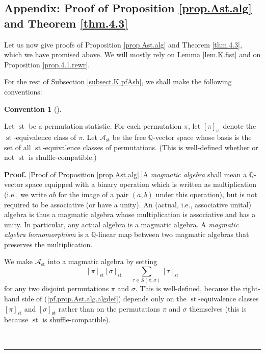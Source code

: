 \documentclass[numbers=enddot,12pt,final,onecolumn,notitlepage]{scrartcl}%
\theoremstyle{definition}
\newtheorem{conv}[theo]{Convention}
\newenvironment{convention}[1][]
{\begin{conv}[#1]\begin{leftbar}}
{\end{leftbar}\end{conv}}
\newenvironment{proof}[1][Proof]{\noindent\textbf{#1.} }{\ \rule{0.5em}{0.5em}}
\newenvironment{convention}[1][Convention]{\noindent\textbf{#1.} }{\ \rule{0.5em}{0.5em}}
\newenvironment{verlong}{}{}
\let\sumnonlimits\sum
\renewcommand{\sum}{\sumnonlimits\limits}
\begin{document}
\begin{verlong}
\subsection{\label{subsect.K.pfAsh}Appendix: Proof of Proposition
\ref{prop.Ast.alg} and Theorem \ref{thm.4.3}}

Let us now give proofs of Proposition \ref{prop.Ast.alg} and Theorem
\ref{thm.4.3}, which we have promised above. We will mostly rely on Lemma
\ref{lem.K.fist} and on Proposition \ref{prop.4.1.rewr}.

For the rest of Subsection \ref{subsect.K.pfAsh}, we shall make the following conventions:

\begin{convention}
Let $\operatorname{st}$ be a permutation statistic. For each permutation
$\pi$, let $\left[  \pi\right]  _{\operatorname{st}}$ denote the
$\operatorname{st}$-equivalence class of $\pi$. Let $\mathcal{A}%
_{\operatorname{st}}$ be the free $\mathbb{Q}$-vector space whose basis is
the set of all $\operatorname{st}$-equivalence classes of permutations. (This
is well-defined whether or not $\operatorname{st}$ is shuffle-compatible.)
\end{convention}

\begin{proof}
[Proof of Proposition \ref{prop.Ast.alg}.]A \textit{magmatic algebra} shall
mean a $\mathbb{Q}$-vector space equipped with a binary operation which is
written as multiplication (i.e., we write $ab$ for the image of a pair
$\left(  a,b\right)  $ under this operation), but is not required to be
associative (or have a unity). An (actual, i.e., associative unital) algebra
is thus a magmatic algebra whose multiplication is associative and has a
unity. In particular, any actual algebra is a magmatic algebra. A
\textit{magmatic algebra homomorphism} is a $\mathbb{Q}$-linear map between
two magmatic algebras that preserves the multiplication.

We make $\mathcal{A}_{\operatorname{st}}$ into a magmatic algebra by setting%
\begin{equation}
\left[  \pi\right]  _{\operatorname{st}}\left[  \sigma\right]
_{\operatorname{st}}=\sum_{\tau\in S\left(  \pi,\sigma\right)  }\left[
\tau\right]  _{\operatorname{st}} \label{pf.prop.Ast.alg.algdef}%
\end{equation}
for any two disjoint permutations $\pi$ and $\sigma$. This is well-defined,
because the right-hand side of (\ref{pf.prop.Ast.alg.algdef}) depends only on
the $\operatorname{st}$-equivalence classes $\left[  \pi\right]
_{\operatorname{st}}$ and $\left[  \sigma\right]  _{\operatorname{st}}$
rather than on the permutations $\pi$ and $\sigma$ themselves (this is because
$\operatorname{st}$ is shuffle-compatible).


\end{proof}
\end{verlong}
\end{document}
